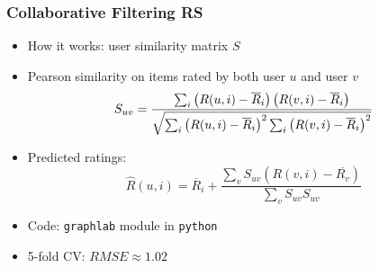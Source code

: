 \documentclass[table]{beamer}
\begin{document}
\begin{frame}
\frametitle{Collaborative Filtering RS}
  \begin{itemize}
    \item How it works: user similarity matrix $S$
    \item Pearson similarity on items rated by both user $u$ and user $v$
      $$S_{uv} = 
      \frac{%
        \sum_i \left(R(u,i) - \overline{R}_i\right)\left(R(v,i) - \overline{R}_i \right) %
      }{%
        \sqrt{\sum_i \left(R(u,i) - \overline{R}_i\right)^2 \sum_i\left(R(v,i) - \overline{R}_i \right)^2 }
        }$$
      \item Predicted ratings: 
        $$\hat{R}(u, i) = 
        \overline{R}_i + 
        \frac{
          \sum_vS_{uv} \left( R(v,i) - \overline{R_v} \right)
        }{
          \sum_vS_{uv}S_{uv}
        }$$
    \item Code: \texttt{graphlab} module in \texttt{python}
    \item 5-fold CV: $RMSE \approx 1.02$
  \end{itemize}
\end{frame}
\end{document}

